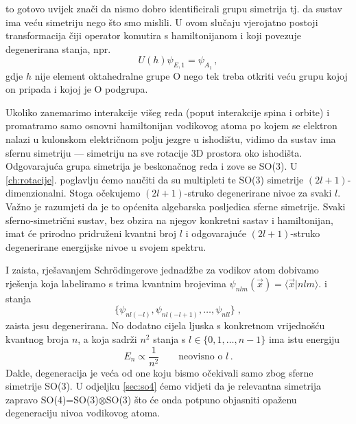 \begin{primjer}
to gotovo uvijek znači da nismo dobro identificirali grupu simetrija
tj. da sustav ima veću simetriju nego što smo mislili. U ovom slučaju
vjerojatno postoji transformacija čiji operator komutira s hamiltonijanom i
koji povezuje degenerirana stanja, npr.
\begin{displaymath}
 U(h) \psi_{E,1} = \psi_{A_1} \,,
\end{displaymath}
gdje $h$ nije element oktahedralne grupe O nego tek treba otkriti veću grupu kojoj
on pripada i kojoj je O podgrupa.

\end{primjer}


\begin{primjer}

Ukoliko zanemarimo interakcije višeg reda (poput interakcije spina i orbite) i
promatramo samo osnovni hamiltonijan vodikovog atoma po kojem se elektron nalazi u kulonskom 
električnom polju jezgre u ishodištu, vidimo da sustav ima sfernu simetriju --- simetriju
na sve rotacije 3D prostora oko ishodišta. Odgovarajuća grupa simetrija je
beskonačnog reda i zove se SO(3).
U \ref{ch:rotacije}. poglavlju ćemo naučiti da su multipleti te SO(3)
simetrije $(2l+1)$-dimenzionalni.
Stoga očekujemo $(2l+1)$-struko degenerirane nivoe za svaki $l$. 
Važno je razumjeti da je to općenita algebarska posljedica sferne simetrije.
Svaki sferno-simetrični sustav, bez obzira na njegov konkretni sastav
i hamiltonijan, imat će prirodno pridruženi kvantni broj $l$
i odgovarajuće $(2l+1)$-struko degenerirane energijske nivoe u svojem spektru.

I zaista, rješavanjem Schr\"{o}dingerove jednadžbe za vodikov atom
dobivamo rješenja koja labeliramo
s trima kvantnim brojevima  $\psi_{nlm}(\vec{x}) = \langle \vec{x} | nlm \rangle$. 
i stanja
\begin{displaymath}
   \{ \psi_{nl(-l)}, \psi_{nl(-l+1)}, \ldots, \psi_{nll}\} \;,
\end{displaymath}
zaista jesu degenerirana.
No dodatno cijela ljuska s konkretnom vrijednošću kvantnog broja $n$, a
koja sadrži $n^2$ stanja s $l \in \{0, 1, \ldots, n-1\}$
ima istu energiju
\begin{displaymath}
  E_n \propto \frac{1}{n^2} \qquad \text{neovisno o $l$} \,.
\end{displaymath}
Dakle, degeneracija je veća od one koju bismo očekivali samo zbog
sferne simetrije SO(3).
U odjeljku \ref{sec:so4}  ćemo vidjeti da je relevantna simetrija
zapravo SO(4)=SO(3)$\otimes$SO(3) što će onda potpuno objasniti
opaženu degeneraciju nivoa vodikovog atoma.
\end{primjer}

